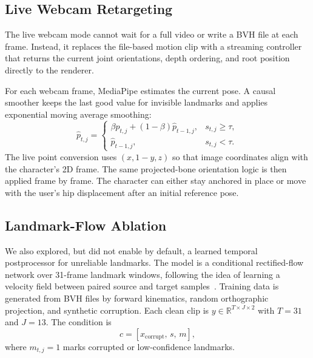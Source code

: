 \documentclass[10pt,twocolumn,letterpaper]{article}
\begin{document}
\subsection{Live Webcam Retargeting}

The live webcam mode cannot wait for a full video or write a BVH file at each frame. Instead, it replaces the file-based motion clip with a streaming controller that returns the current joint orientations, depth ordering, and root position directly to the renderer.

For each webcam frame, MediaPipe estimates the current pose. A causal smoother keeps the last good value for invisible landmarks and applies exponential moving average smoothing:
\begin{equation}
\hat{p}_{t,j}=
\begin{cases}
\beta p_{t,j}+(1-\beta)\hat{p}_{t-1,j}, & s_{t,j}\ge \tau,\\
\hat{p}_{t-1,j}, & s_{t,j}<\tau.
\end{cases}
\label{eq:ema}
\end{equation}
The live point conversion uses $(x,1-y,z)$ so that image coordinates align with the character's 2D frame. The same projected-bone orientation logic is then applied frame by frame. The character can either stay anchored in place or move with the user's hip displacement after an initial reference pose.

\subsection{Landmark-Flow Ablation}

We also explored, but did not enable by default, a learned temporal postprocessor for unreliable landmarks. The model is a conditional rectified-flow network over 31-frame landmark windows, following the idea of learning a velocity field between paired source and target samples~\cite{Liu2022RectifiedFlow}. Training data is generated from BVH files by forward kinematics, random orthographic projection, and synthetic corruption. Each clean clip is $y\in\mathbb{R}^{T\times J\times2}$ with $T=31$ and $J=13$. The condition is
\begin{equation}
c=\left[x_{\mathrm{corrupt}},\,s,\,m\right],
\end{equation}
where $m_{t,j}=1$ marks corrupted or low-confidence landmarks.
\end{document}
